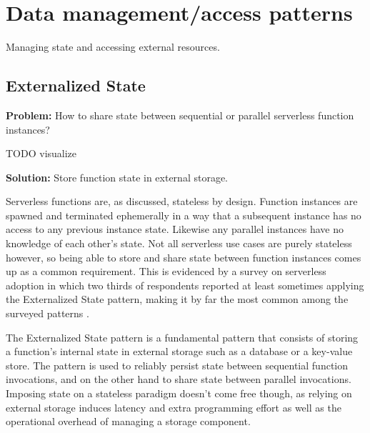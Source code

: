 
\section{Data management/access patterns} \label{sec:dataManagementPatterns}

Managing state and accessing external resources.

\subsection{Externalized State} \label{subsec:externalizedState}

\textbf{Problem:} How to share state between sequential or parallel serverless function instances?

TODO visualize

\textbf{Solution:} Store function state in external storage.

Serverless functions are, as discussed, stateless by design. Function instances are spawned and terminated ephemerally in a way that a subsequent instance has no access to any previous instance state. Likewise any parallel instances have no knowledge of each other's state. Not all serverless use cases are purely stateless however, so being able to store and share state between function instances comes up as a common requirement. This is evidenced by a survey on serverless adoption in which two thirds of respondents reported at least sometimes applying the Externalized State pattern, making it by far the most common among the surveyed patterns \parencite{leitner18industrialpractice}.

The Externalized State pattern is a fundamental pattern that consists of storing a function's internal state in external storage such as a database or a key-value store. The pattern is used to reliably persist state between sequential function invocations, and on the other hand to share state between parallel invocations. Imposing state on a stateless paradigm doesn't come free though, as relying on external storage induces latency and extra programming effort as well as the operational overhead of managing a storage component. \parencite{leitner18industrialpractice}

